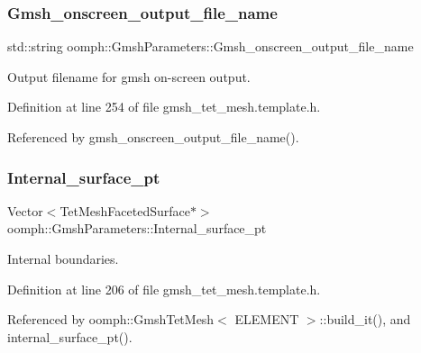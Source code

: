 \subsubsection{\texorpdfstring{Gmsh\+\_\+onscreen\+\_\+output\+\_\+file\+\_\+name}{Gmsh\_onscreen\_output\_file\_name}}
{\footnotesize\ttfamily std\+::string oomph\+::\+Gmsh\+Parameters\+::\+Gmsh\+\_\+onscreen\+\_\+output\+\_\+file\+\_\+name\hspace{0.3cm}{\ttfamily [private]}}



Output filename for gmsh on-\/screen output. 



Definition at line 254 of file gmsh\+\_\+tet\+\_\+mesh.\+template.\+h.



Referenced by gmsh\+\_\+onscreen\+\_\+output\+\_\+file\+\_\+name().

\mbox{\label{classoomph_1_1GmshParameters_aaa4afdde73a7fc67d5c2ba2976235381}} 
\subsubsection{\texorpdfstring{Internal\+\_\+surface\+\_\+pt}{Internal\_surface\_pt}}
{\footnotesize\ttfamily Vector$<$Tet\+Mesh\+Faceted\+Surface$\ast$$>$ oomph\+::\+Gmsh\+Parameters\+::\+Internal\+\_\+surface\+\_\+pt\hspace{0.3cm}{\ttfamily [private]}}



Internal boundaries. 



Definition at line 206 of file gmsh\+\_\+tet\+\_\+mesh.\+template.\+h.



Referenced by oomph\+::\+Gmsh\+Tet\+Mesh$<$ E\+L\+E\+M\+E\+N\+T $>$\+::build\+\_\+it(), and internal\+\_\+surface\+\_\+pt().

\mbox{\label{classoomph_1_1GmshParameters_a65bd88591891ff4284fb4e03d6f49c14}} 
